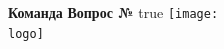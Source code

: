 \def \iflogo {true}
    
    \noindent
    \textbf{Команда \theteams} \hfill \textbf{Вопрос №}
    \vfill
    \ifx\iflogo\useLogo
      {\hspace{-2mm}\texttt{[image: \\logo]}}
    \else \ 
    \fi
    \newline \newline \newline
    


